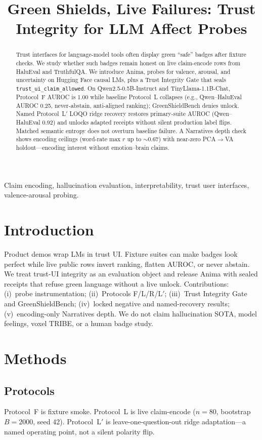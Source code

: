 \documentclass[conference]{IEEEtran}
\title{Green Shields, Live Failures: Trust Integrity for LLM Affect Probes}
\author{
\IEEEauthorblockN{Siddarth Boggarapu}
\IEEEauthorblockA{Independent Researcher\\
Bengaluru, India\\
siddarthb078@gmail.com}
}
\begin{document}
\maketitle

\begin{abstract}
Trust interfaces for language-model tools often display green ``safe'' badges after fixture checks.
We study whether such badges remain honest on live claim-encode rows from HaluEval and TruthfulQA.
We introduce Anima, probes for valence, arousal, and uncertainty on Hugging Face causal LMs, plus a
Trust Integrity Gate that seals \texttt{trust\_ui\_claim\_allowed}.
On Qwen2.5-0.5B-Instruct and TinyLlama-1.1B-Chat, Protocol~F AUROC is 1.00 while baseline Protocol~L
collapses (e.g., Qwen--HaluEval AUROC 0.25, never-abstain, anti-aligned ranking); GreenShieldBench denies unlock.
Named Protocol~L$'$ LOQO ridge recovery restores primary-suite AUROC (Qwen--HaluEval 0.92) and unlocks adapted
receipts without silent production label flips.
Matched semantic entropy does not overturn baseline failure.
A Narratives depth check shows encoding ceilings (word-rate max $r$ up to $\sim$0.67) with near-zero PCA$\to$VA
holdout---encoding interest without emotion--brain claims.
\end{abstract}

\begin{IEEEkeywords}
Claim encoding, hallucination evaluation, interpretability, trust user interfaces, valence-arousal probing.
\end{IEEEkeywords}

\section{Introduction}
Product demos wrap LMs in trust UI. Fixture suites can make badges look perfect while live public rows invert ranking,
flatten AUROC, or never abstain.
We treat trust-UI integrity as an evaluation object and release Anima with sealed receipts that refuse green language
without a live unlock.
Contributions: (i)~probe instrumentation; (ii)~Protocols F/L/R/L$'$; (iii)~Trust Integrity Gate and GreenShieldBench;
(iv)~locked negative and named-recovery results; (v)~encoding-only Narratives depth.
We do not claim hallucination SOTA, model feelings, voxel TRIBE, or a human badge study.

\section{Methods}
\subsection{Protocols}
Protocol~F is fixture smoke.
Protocol~L is live claim-encode ($n{=}80$, bootstrap $B{=}2000$, seed 42).
Protocol~L$'$ is leave-one-question-out ridge adaptation---a named operating point, not a silent polarity flip.
\end{document}
